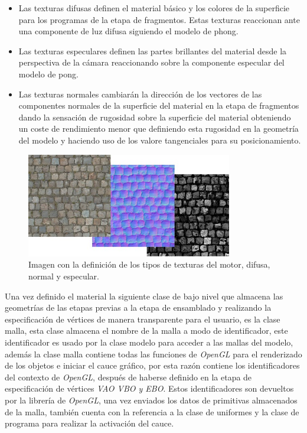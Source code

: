 \documentclass[a4paper]{book}
\begin{document}
\begin{itemize}

\item Las texturas difusas definen el material básico y los colores de la superficie para los programas de la etapa de fragmentos. Estas
texturas reaccionan ante una componente de luz difusa siguiendo el modelo de phong.

\item Las texturas especulares definen las partes brillantes del material desde la perspectiva de la cámara reaccionando sobre la componente
especular del modelo de pong.

\item Las texturas normales cambiarán la dirección de los vectores de las componentes normales de la superficie del material en la etapa de
fragmentos dando la sensación de rugosidad sobre la superficie del material obteniendo un coste de rendimiento menor que definiendo
esta rugosidad en la geometría del modelo y haciendo uso de los valore tangenciales para su posicionamiento.

\end{itemize}

\begin{figure}[H]
    \centering
    \includegraphics[width=9cm, keepaspectratio]{img/custom-textures.jpg}
    \caption{Imagen con la definición de los tipos de texturas del motor, difusa, normal y especular.}
    \label{custom_textures}
\end{figure}

Una vez definido el material la siguiente clase de bajo nivel que almacena las geometrías de las etapas previas a la etapa de ensamblado y
realizando la especificación de vértices de manera transparente para el usuario, es la clase malla, esta clase almacena el nombre de la malla a
modo de identificador, este identificador es usado por la clase modelo para acceder a las mallas del modelo, además la clase malla contiene
todas las funciones de \textit{OpenGL} para el renderizado de los objetos e iniciar el cauce gráfico, por esta razón contiene los
identificadores del contexto de \textit{OpenGL}, después de haberse definido en la etapa de especificación de vértices \textit{VAO VBO y EBO}. Estos
identificadores son devueltos por la librería de \textit{OpenGL}, una vez enviados los datos de primitivas almacenados de la malla, también cuenta
con la referencia a la clase de uniformes y la clase de programa para realizar la activación del cauce.
\end{document}

